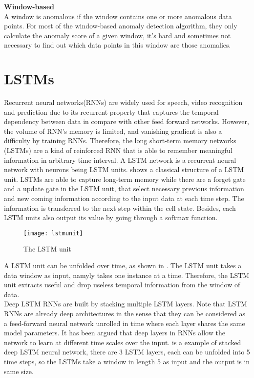 \textbf{Window-based}\\
A window is anomalous if the window contains one or more anomalous data points. For most of the window-based anomaly detection algorithm, they only calculate the anomaly score of a given window, it’s hard and sometimes not necessary to find out which data points in this window are those anomalies.

\section{LSTMs}
\label{sec:LSTMs}

Recurrent neural networks(RNNs) are widely used for speech, video recognition and prediction due to its recurrent property that captures the temporal dependency between data in compare with other feed forward networks. However, the volume of RNN’s memory is limited, and vanishing gradient is also a difficulty by training RNNs. Therefore, the long short-term memory networks (LSTMs) are a kind of reinforced RNN that is able to remember meaningful information in arbitrary time interval. A LSTM network is a recurrent neural network with neurons being LSTM units.  shows a classical structure of a LSTM unit. LSTMs are able to capture long-term memory while there are a forget gate and a update gate in the LSTM unit, that select necessary previous information and new coming information according to the input data at each time step. The information is transferred to the next step within the cell state. Besides, each LSTM units also output its value by going through a softmax function.

\begin{figure}[ht]
\centering
\texttt{[image: lstmunit]}
\caption[LSTM unit]{The LSTM unit}
\label{fig:lstmunit}
\end{figure}


A LSTM unit can be unfolded over time, as shown in . The LSTM unit takes a data window as input, namyly takes one instance at a time. Therefore, the LSTM unit extracts useful and drop useless temporal information from the window of data.\\


Deep LSTM RNNs are built by stacking multiple LSTM layers. Note that LSTM RNNs are already deep architectures in the sense that they can be considered as a feed-forward neural network unrolled in time where each layer shares the same model parameters. It has been argued that deep layers in RNNs allow the network to learn at different time scales over the input\cite{deep}.  is a example of stacked deep LSTM neural network, there are 3 LSTM layers, each can be unfolded into 5 time steps, so the LSTMs take a window in length 5 as input and the output is in same size.

